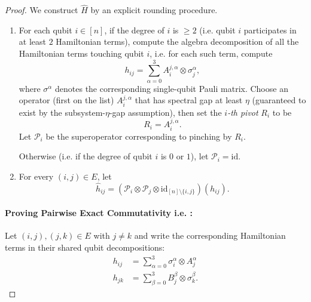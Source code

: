 \documentclass[11pt]{article}
\theoremstyle{plain}
\begin{document}
\begin{proof}
 We construct $\widehat{H}$ by an explicit rounding procedure.
   
\begin{enumerate}

    \item For each qubit $i \in [n]$, if the degree of $i$ is $\geq 2$ (i.e. qubit $i$ participates in at least $2$ Hamiltonian terms), compute the algebra decomposition of all the Hamiltonian terms touching qubit $i$, i.e. for each such term, compute
    \[ h_{ij} = \sum_{\alpha =0}^{3} A^{j, \alpha}_i \otimes \sigma^{\alpha}_j, \]
    where $\sigma^\alpha$ denotes the corresponding single-qubit Pauli matrix. Choose an operator (first on the list) $A^{j, \alpha}_i$ that has spectral gap at least $\eta$ (guaranteed to exist by the subsystem-$\eta$-gap assumption), then set the \emph{$i$-th pivot} $R_i$ to be
    \[ R_i = A^{j, \alpha}_i.\]
    Let $\mathcal{P}_i$ be the superoperator corresponding to pinching by $R_i$.

    Otherwise (i.e. if the degree of qubit $i$ is $0$ or $1$), let $\mathcal{P}_i = \mathrm{id}$.
    \item  For every $(i,j) \in E$, let
    \[ \widehat{h}_{ij} = (\mathcal{P}_i \otimes \mathcal{P}_j \otimes \mathrm{id}_{[n] \setminus \{i,j\}})(h_{ij}). \]
\end{enumerate}

\paragraph{Proving Pairwise Exact Commutativity i.e. :} Let $(i,j), (j,k) \in E$  with $j \neq k$ and write the corresponding Hamiltonian terms in their shared qubit decompositions:
\begin{align}
    h_{ij} &= \sum_{\alpha =0}^{3} \sigma^{\alpha}_i \otimes A^{\alpha}_j \\
    h_{jk} &= \sum_{\beta =0}^{3} B^{\beta}_j \otimes \sigma^{\beta}_k.
\end{align}


\end{proof}
\end{document}
